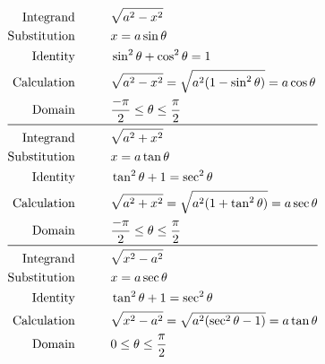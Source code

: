 \documentclass[fleqn]{report}
\begin{document}
\begin{align*}
\text{Integrand} \hspace{1cm} 
& \sqrt{a^2 - x^2} \\
\text{Substitution} \hspace{1cm} 
& x = a \sin \theta \\
\text{Identity} \hspace{1cm} 
& \sin^2 \theta + \cos^2 \theta = 1 \\
\text{Calculation} \hspace{1cm} 
& \sqrt{a^2 - x^2} = \sqrt{a^2(1-\sin^2 \theta)} = a \cos \theta \\
\text{Domain} \hspace{1cm} 
& \frac{-\pi}{2} \leq \theta \leq \frac{\pi}{2} \\
\midrule
\text{Integrand} \hspace{1cm} 
& \sqrt{a^2 + x^2} \\
\text{Substitution} \hspace{1cm} 
& x = a \tan \theta \\
\text{Identity} \hspace{1cm} 
& \tan^2 \theta + 1 = \sec^2 \theta \\
\text{Calculation} \hspace{1cm} 
& \sqrt{a^2 + x^2} = \sqrt{a^2(1+\tan^2 \theta)} = a \sec \theta \\
\text{Domain} \hspace{1cm} 
& \frac{-\pi}{2} \leq \theta \leq \frac{\pi}{2} \\
\midrule
\text{Integrand} \hspace{1cm} 
& \sqrt{x^2 - a^2} \\
\text{Substitution} \hspace{1cm} 
& x = a \sec \theta \\
\text{Identity} \hspace{1cm} 
& \tan^2 \theta + 1 = \sec^2 \theta \\
\text{Calculation} \hspace{1cm} 
& \sqrt{x^2 - a^2} = \sqrt{a^2(\sec^2 \theta - 1)} = a \tan \theta \\
\text{Domain} \hspace{1cm} 
& 0 \leq \theta \leq \frac{\pi}{2} 
\end{align*}
\end{document}
